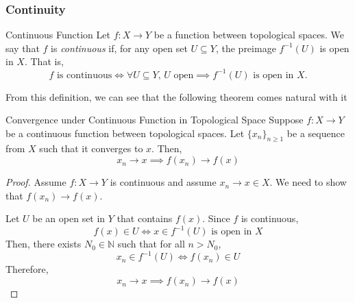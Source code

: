 \subsubsection{Continuity}
\begin{defbox}{Continuous Function}
    Let $f : X \to Y$ be a function between topological spaces. We say that $f$ is \textit{continuous} if, for any open set $U \subseteq Y$, the preimage $f^{-1}(U)$ is open in $X$. That is,
    \[
f \text{ is continuous} \iff \forall U \subseteq Y, \, U \text{ open} \implies f^{-1}(U) \text{ is open in } X.
\]
\end{defbox}
From this definition, we can see that the following theorem comes natural with it
\begin{thmbox}{Convergence under Continuous Function in Topological Space}
    Suppose $f: X \rightarrow Y$ be a continuous function between topological spaces. Let $\{x_n\}_{n\geq 1}$ be a sequence from $X$ such that it converges to $x$. Then,
    \[
    x_n \rightarrow x \implies f(x_n) \rightarrow f(x)
    \]
\end{thmbox}
\begin{proof}
    Assume $f:X\rightarrow Y$ is continuous and assume $x_n \rightarrow x\in X$. We need to show that $f(x_n)\rightarrow f(x)$. 

    Let $U$ be an open set in $Y$ that contains $f(x)$. Since $f$ is continuous,
    \[
    f(x)\in U \iff x \in f^{-1}(U) \text{ is open in }X
    \]
    Then, there exists $N_0\in\mathbb{N}$ such that for all $n > N_0$,
    \[
    x_n \in f^{-1}(U) \iff f(x_n) \in U
    \]
    Therefore,
    \[
    x_n \rightarrow x \implies f(x_n) \rightarrow f(x)
    \]
\end{proof}
